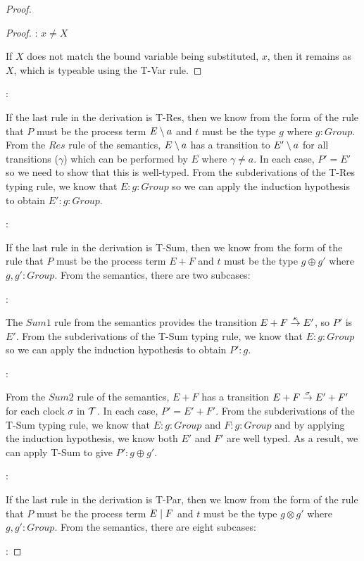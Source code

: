 \begin{proof}
\begin{proof}
: $x \ne X$

\noindent If $X$ does not match the bound variable being substituted, $x$, then it
remains as $X$, which is typeable using the T-Var rule.

\end{proof}

:

\noindent If the last rule in the derivation is T-Res, then we know
from the form of the rule that $P$ must be the process term $E
\setminus {a}$ and $t$ must be the type $g$ where $g : Group$.  From the
$Res$ rule of the semantics, $E \setminus {a}$ has a transition to $E'
\setminus {a}$ for all transitions ($\gamma$) which can be performed by $E$
where $\gamma \ne a$.  In each case, $P' = E'$ so we need to show that
this is well-typed.  From the subderivations of the T-Res typing
rule, we know that $E : g : Group$ so we can apply the induction
hypothesis to obtain $E' : g : Group$.

:

\noindent If the last rule in the derivation is T-Sum, then we know
from the form of the rule that $P$ must be the process term $E + F$
and $t$ must be the type $g \oplus g'$ where $g, g' : Group$.  From
the semantics, there are two subcases:

:

\noindent The $Sum1$ rule from the semantics provides the transition
$E + F \stackrel{\kappa}{\rightarrow} E'$, so $P'$ is $E'$.  From the
subderivations of the T-Sum typing rule, we know that $E : g : Group$
so we can apply the induction hypothesis to obtain $P' : g$.

:

\noindent From the $Sum2$ rule of the semantics, $E + F$ has a
transition $E + F \stackrel{\sigma}{\rightarrow} E' + F'$ for each clock $\sigma$ in
$\text{$\mathcal{T}$}$.  In each case, $P' = E' + F'$.  From the subderivations of
the T-Sum typing rule, we know that $E : g : Group$ and $F : g :
Group$ and by applying the induction hypothesis, we know both $E'$ and
$F'$ are well typed.  As a result, we can apply T-Sum to give $P' : g
\oplus g'$.

:

\noindent If the last rule in the derivation is T-Par, then we know
from the form of the rule that $P$ must be the process term $E \;|\; F$
and $t$ must be the type $g \otimes g'$ where $g, g' : Group$.  From
the semantics, there are eight subcases:

:


\end{proof}
